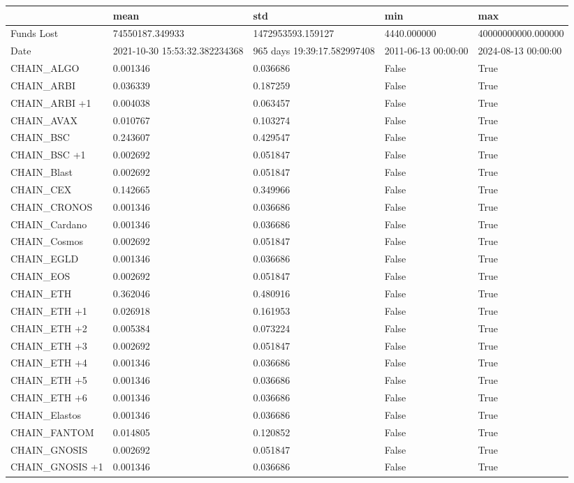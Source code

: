 \begin{tabular}{lllll}
\toprule
 & mean & std & min & max \\
\midrule
Funds Lost & 74550187.349933 & 1472953593.159127 & 4440.000000 & 40000000000.000000 \\
Date & 2021-10-30 15:53:32.382234368 & 965 days 19:39:17.582997408 & 2011-06-13 00:00:00 & 2024-08-13 00:00:00 \\
CHAIN\_ALGO  & 0.001346 & 0.036686 & False & True \\
CHAIN\_ARBI  & 0.036339 & 0.187259 & False & True \\
CHAIN\_ARBI +1 & 0.004038 & 0.063457 & False & True \\
CHAIN\_AVAX  & 0.010767 & 0.103274 & False & True \\
CHAIN\_BSC  & 0.243607 & 0.429547 & False & True \\
CHAIN\_BSC +1 & 0.002692 & 0.051847 & False & True \\
CHAIN\_Blast  & 0.002692 & 0.051847 & False & True \\
CHAIN\_CEX  & 0.142665 & 0.349966 & False & True \\
CHAIN\_CRONOS  & 0.001346 & 0.036686 & False & True \\
CHAIN\_Cardano  & 0.001346 & 0.036686 & False & True \\
CHAIN\_Cosmos  & 0.002692 & 0.051847 & False & True \\
CHAIN\_EGLD  & 0.001346 & 0.036686 & False & True \\
CHAIN\_EOS  & 0.002692 & 0.051847 & False & True \\
CHAIN\_ETH  & 0.362046 & 0.480916 & False & True \\
CHAIN\_ETH +1 & 0.026918 & 0.161953 & False & True \\
CHAIN\_ETH +2 & 0.005384 & 0.073224 & False & True \\
CHAIN\_ETH +3 & 0.002692 & 0.051847 & False & True \\
CHAIN\_ETH +4 & 0.001346 & 0.036686 & False & True \\
CHAIN\_ETH +5 & 0.001346 & 0.036686 & False & True \\
CHAIN\_ETH +6 & 0.001346 & 0.036686 & False & True \\
CHAIN\_Elastos  & 0.001346 & 0.036686 & False & True \\
CHAIN\_FANTOM  & 0.014805 & 0.120852 & False & True \\
CHAIN\_GNOSIS  & 0.002692 & 0.051847 & False & True \\
CHAIN\_GNOSIS +1 & 0.001346 & 0.036686 & False & True \\

\end{tabular}
